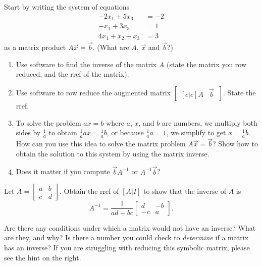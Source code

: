 \begin{problem}
Start by writing the system of equations 
\begin{align*}
 -2x_1+ 5x_3 &=-2\\
 -x_1+ 3x_3 &=1\\
 4x_1 +x_2  -x_3 &=3
\end{align*} 
as a matrix product $A\vec x =\vec b$.  (What are $A$, $\vec x$ and $\vec b$?)  
\begin{enumerate}
\item 
{}%
Use software to find the inverse of the matrix $A$ (state the matrix you row reduced, and the rref of the matrix). 
\item Use software to row reduce the augmented matrix $\begin{bmatrix}[c|c]A&\vec b \ \end{bmatrix}$. State the rref.
\item To solve the problem $ax=b$ where $a$, $x$, and $b$ are numbers, we multiply both sides by $\frac{1}{a}$ to obtain $\frac{1}{a}ax=\frac{1}{a}b$, or because $\frac{1}{a}a=1$, we simplify to get $x=\frac{1}{a}b$. How can you use this idea to solve the matrix problem $A\vec x = \vec b$?  Show how to obtain the solution to this system by using the matrix inverse. 
\item Does it matter if you compute $\vec b A^{-1}$ or  $A^{-1}\vec b$?
\end{enumerate}
\end{problem}



\begin{problem}\label{inverse of 2 by 2}
%
Let $A=\begin{bmatrix}a&b\\c&d\end{bmatrix}$. Obtain the rref of $[A | I]$ to show that the inverse of $A$ is 
$$A^{-1}=\frac{1}{ad-bc}\begin{bmatrix}d&-b\\-c&a\end{bmatrix}.$$

Are there any conditions under which a matrix would not have an inverse?  What are they, and why? Is there a number you could check to {\it determine} if a matrix has an inverse? If you are struggling with reducing this symbolic matrix, please see the hint on the right.
\end{problem}

